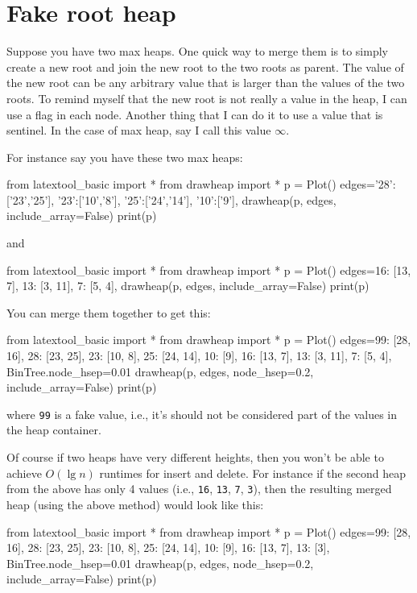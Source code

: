 \section{Fake root heap}

Suppose you have two max heaps.
One quick way to merge them is to simply create a new root
and join the new root to the two roots as parent.
The value of the new root can be any arbitrary value that
is larger than the values of the two roots.
To remind myself that the new root is not really a value in the
heap, I can use a flag in each node.
Another thing that I can do it to use a value that is sentinel.
In the case of max heap, say I call this value $\infty$.

For instance say you have these two max heaps:
\begin{python}
from latextool_basic import *
from drawheap import *
p = Plot()
edges={'28':['23','25'],
       '23':['10','8'],
       '25':['24','14'],
       '10':['9'],
       }
drawheap(p, edges, include_array=False)
print(p)
\end{python}

and

\begin{python}
from latextool_basic import *
from drawheap import *
p = Plot()
edges={16: [13, 7],
       13: [3, 11],
       7: [5, 4],
       }
drawheap(p, edges, include_array=False)
print(p)
\end{python}


You can merge them together to get this:

\begin{python}
from latextool_basic import *
from drawheap import *
p = Plot()
edges={99: [28, 16],
       28: [23, 25],
       23: [10, 8],
       25: [24, 14],
       10: [9],
       16: [13, 7],
       13: [3, 11],
        7: [5, 4],
      }
BinTree.node_hsep=0.01
drawheap(p, edges, node_hsep=0.2, include_array=False)
print(p)
\end{python}

where \verb!99! is a fake value, i.e.,
it's 
should not be considered part of the values in
the heap container.

Of course if two heaps have very different
heights, then you won't
be able to achieve
$O(\lg n)$ runtimes for insert and delete.
For instance if the second heap from the above
has only 4 values
(i.e., \verb!16!, \verb!13!, \verb!7!, \verb!3!),
then the resulting
merged heap (using the above method)
would look like this:

\begin{python}
from latextool_basic import *
from drawheap import *
p = Plot()
edges={99: [28, 16],
       28: [23, 25],
       23: [10, 8],
       25: [24, 14],
       10: [9],
       16: [13, 7],
       13: [3],
      }
BinTree.node_hsep=0.01
drawheap(p, edges, node_hsep=0.2, include_array=False)
print(p)
\end{python}
